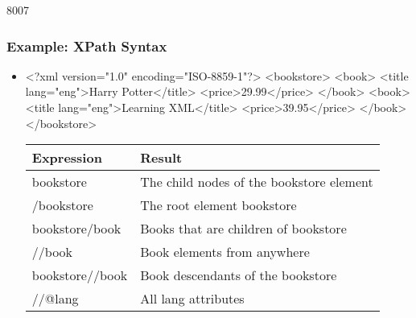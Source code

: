 \begin{slide}[fragile]{8007}
\frametitle{Example: XPath Syntax}
\begin{itemize}
\item[]
\begin{xml}
<?xml version="1.0" encoding="ISO-8859-1"?>
<bookstore>
    <book>
        <title lang="eng">Harry Potter</title>
        <price>29.99</price>
    </book>
    <book>
        <title lang="eng">Learning XML</title>
        <price>39.95</price>
    </book>
</bookstore>
\end{xml}
\begin{center}
\begin{tabular}{|l|l|}
\hline
\textbf{Expression} & \textbf{Result} \\ \hline
bookstore           & The child nodes of the bookstore element \\ \hline
/bookstore          & The root element bookstore \\ \hline
bookstore/book      & Books that are children of bookstore \\ \hline
//book              & Book elements from anywhere\\ \hline
bookstore//book     & Book descendants of the bookstore \\ \hline
//@lang             & All lang attributes \\ \hline
\end{tabular}
\end{center}
\end{itemize}
\end{slide}


